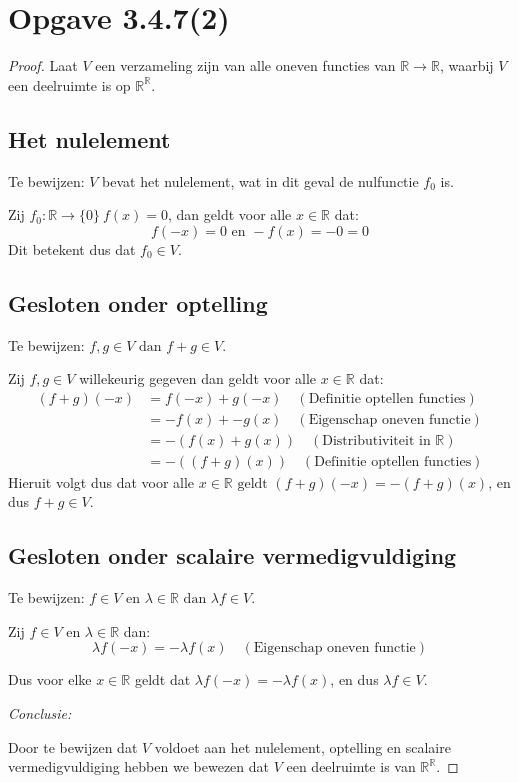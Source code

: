 \documentclass{article}
\newcommand{\R}{\mathbb{R}}
\newcommand{\en}{\text{ en }}
\newcommand{\dan}{\text{ dan }}
\newcommand{\geldt}{\text{ geldt }}
\begin{document}
\section*{Opgave 3.4.7(2)}
\begin{proof}
    Laat $V$ een verzameling zijn van
    alle oneven functies van $\R \rightarrow \R$,
    waarbij $V$ een deelruimte is op $\R^{\R}$.

    \subsection*{Het nulelement}
    Te bewijzen: $V$ bevat het nulelement,
    wat in dit geval de nulfunctie $f_0$ is.

    Zij $f_0:\R \rightarrow \{0\} \ f(x) = 0$, dan
    geldt voor alle $x \in \R$ dat:
    \[f(-x) = 0 \en -f(x) = -0 = 0\]
    Dit betekent dus dat $f_0 \in V$.

    \subsection*{Gesloten onder optelling}
    Te bewijzen: $f, g \in V \dan f + g \in V$.

    Zij $f, g \in V$ willekeurig gegeven dan
    geldt voor alle $x \in \R$ dat:
    \begin{align*}
        (f + g)(-x) & = f(-x) + g(-x)  \quad (\text{Definitie optellen functies}) \\
                    & = -f(x) + -g(x) \quad (\text{Eigenschap oneven functie})    \\
                    & = -(f(x) + g(x)) \quad (\text{Distributiviteit in $\R$})    \\
                    & = -((f + g)(x)) \quad (\text{Definitie optellen functies})
    \end{align*}
    Hieruit volgt dus dat voor alle
    $x \in \R \geldt
        (f + g)(-x) = -(f + g)(x)$, en dus
    $f + g \in V$.

    \subsection*{Gesloten onder scalaire vermedigvuldiging}
    Te bewijzen: $f \in V \en \lambda \in \R \dan \lambda f \in V$.

    Zij $f \in V \en \lambda \in \R$ dan:
    \[\lambda f(-x) = -\lambda f(x) \quad (\text{Eigenschap oneven functie})\]

    Dus voor elke $x \in \R$ geldt dat $\lambda f(-x) = -\lambda f(x)$, en dus $\lambda f \in V$.

    \bigskip

    \emph{Conclusie:}

    Door te bewijzen dat $V$ voldoet aan het nulelement, optelling en scalaire vermedigvuldiging
    hebben we bewezen dat $V$ een deelruimte is van $\R^{\R}$.
\end{proof}
\end{document}
